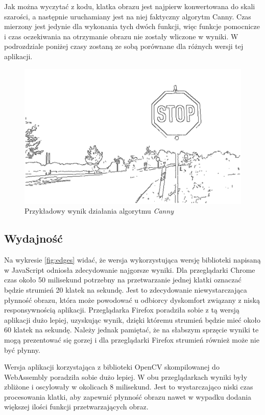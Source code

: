 \documentclass[language=polish,type=master]{aghmodern}
\begin{document}
Jak można wyczytać z kodu, klatka obrazu jest najpierw konwertowana do skali szarości, a następnie uruchamiany jest na niej faktyczny algorytm Canny.
Czas mierzony jest jedynie dla wykonania tych dwóch funkcji, więc funkcje pomocnicze i czas oczekiwania na otrzymanie obrazu nie zostały wliczone w wyniki.
W podrozdziale poniżej czasy zostaną ze sobą porównane dla różnych wersji tej aplikacji.

\begin{figure}[H]
    \centering
    \includegraphics[width=\textwidth]{images/edges.pdf}
    \vspace*{10pt}
    \caption{Przykładowy wynik działania algorytmu \emph{Canny}}
    \label{fig:edges_example}
\end{figure}

\subsection{Wydajność}
Na wykresie \ref{fig:edges} widać, że wersja wykorzystująca wersję biblioteki napisaną w JavaScript odniosła zdecydowanie najgorsze wyniki.
Dla przeglądarki Chrome czas około 50 milisekund potrzebny na przetwarzanie jednej klatki oznaczać będzie strumień 20 klatek na sekundę.
Jest to zdecydowanie niewystarczająca płynność obrazu, która może powodować u odbiorcy dyskomfort związany z niską responsywnością aplikacji.
Przeglądarka Firefox poradziła sobie z tą wersją aplikacji dużo lepiej, uzyskując wynik, dzięki któremu strumień będzie mieć około 60 klatek na sekundę.
Należy jednak pamiętać, że na słabszym sprzęcie wyniki te mogą prezentować się gorzej i dla przeglądarki Firefox strumień również może nie być płynny.

Wersja aplikacji korzystająca z biblioteki OpenCV skompilowanej do WebAssembly poradziła sobie dużo lepiej.
W obu przeglądarkach wyniki były zbliżone i oscylowały w okolicach 8 milisekund.
Jest to wystarczająco niski czas procesowania klatki, aby zapewnić płynność obrazu nawet w wypadku dodania większej ilości funkcji przetwarzających obraz.
\end{document}
